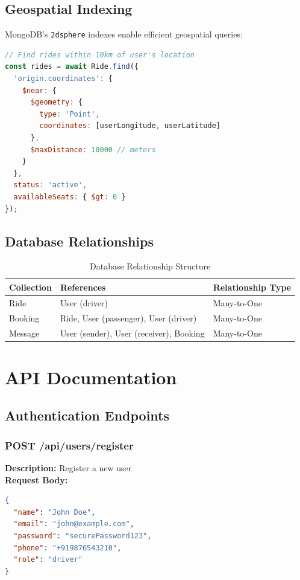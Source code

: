\documentclass[12pt,a4paper]{article}
\begin{document}
\subsection{Geospatial Indexing}

MongoDB's \texttt{2dsphere} indexes enable efficient geospatial queries:

\begin{lstlisting}[language=JavaScript, caption=Geospatial Query Example]
// Find rides within 10km of user's location
const rides = await Ride.find({
  'origin.coordinates': {
    $near: {
      $geometry: {
        type: 'Point',
        coordinates: [userLongitude, userLatitude]
      },
      $maxDistance: 10000 // meters
    }
  },
  status: 'active',
  availableSeats: { $gt: 0 }
});
\end{lstlisting}

\subsection{Database Relationships}

\begin{table}[H]
\centering
\begin{tabular}{|l|l|l|}
\hline
\textbf{Collection} & \textbf{References} & \textbf{Relationship Type} \\
\hline
Ride & User (driver) & Many-to-One \\
Booking & Ride, User (passenger), User (driver) & Many-to-One \\
Message & User (sender), User (receiver), Booking & Many-to-One \\
\hline
\end{tabular}
\caption{Database Relationship Structure}
\end{table}

\newpage

\section{API Documentation}

\subsection{Authentication Endpoints}

\subsubsection{POST /api/users/register}
\textbf{Description:} Register a new user\\
\textbf{Request Body:}
\begin{lstlisting}[language=JSON]
{
  "name": "John Doe",
  "email": "john@example.com",
  "password": "securePassword123",
  "phone": "+919876543210",
  "role": "driver"
}
\end{lstlisting}
\end{document}
